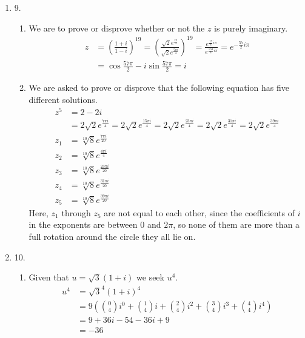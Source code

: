 \documentclass[fleqn]{article}
\newenvironment{answers}{ %
	\begin{enumerate}
		\setlength{\itemsep}{\bigskipamount}
}{\end{enumerate}}
\begin{document}
\begin{answers}
	\item[9.]
		\begin{enumerate}
			\item
				We are to prove or disprove whether or not the \(z\) is purely imaginary.
				\begin{align*}
					z & = \left( \frac{1+i}{1-i} \right)^{19}
					= \left( \frac{\sqrt{2}e^{\frac{i\pi}{4}}}{\sqrt{2}e^{\frac{7i\pi}{4}}} \right)^{19}
					= \frac{e^{\frac{19}{4}i\pi}}{e^{\frac{133}{4}i\pi}}
					= e^{-\frac{57}{2}i\pi} \\
					  & = \cos\frac{57\pi}{2} - i \sin\frac{57\pi}{2} = i
				\end{align*}

			\item
				We are asked to prove or disprove that the following equation has five different solutions.
				\begin{align*}
					z^5 & = 2 - 2i \\
					    & = 2\sqrt{2}e^{\frac{7\pi i}{4}} = 2\sqrt{2}e^{\frac{15\pi i}{4}} = 2\sqrt{2}e^{\frac{23\pi i}{4}} = 2\sqrt{2}e^{\frac{31\pi i}{4}} = 2\sqrt{2}e^{\frac{39\pi i}{4}} \\
					z_1 & = \sqrt[10]{8}e^{\frac{7\pi i}{20}} \\
					z_2 & = \sqrt[10]{8}e^{\frac{4\pi i}{4}} \\
					z_3 & = \sqrt[10]{8}e^{\frac{23\pi i}{20}} \\
					z_4 & = \sqrt[10]{8}e^{\frac{31\pi i}{20}} \\
					z_5 & = \sqrt[10]{8}e^{\frac{39\pi i}{20}}
				\end{align*}
				Here, \(z_1\) through \(z_5\) are not equal to each other, since the coefficients of \(i\) in the exponents are between 0 and \(2\pi\), so none of them are more than a full rotation around the circle they all lie on.
		\end{enumerate}

	\item[10.]
		\begin{enumerate}
			\item
				Given that \(u = \sqrt{3}(1+i)\) we seek \(u^4\).
				\begin{align*}
					u^4 & = \sqrt{3}^4(1+i)^4 \\
					    & = 9\left( \binom{0}{4}i^0 + \binom{1}{4}i + \binom{2}{4}i^2 + \binom{3}{4}i^3 + \binom{4}{4}i^4 \right) \\
					    & = 9 + 36i - 54 - 36i + 9 \\
					    & = -36
				\end{align*}


\end{enumerate}
\end{answers}
\end{document}
